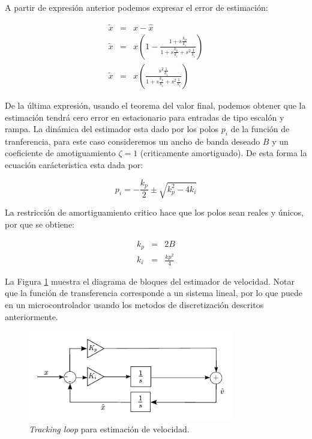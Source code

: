 A partir de expresión anterior podemos expresar el error de estimación:

\begin{eqnarray}
\tilde{x} &=& x - \hat{x} \\
\tilde{x} &=& x \left(1 -  \frac{1+s\frac{k_p}{k_i}}{1+s\frac{k_p}{k_i}+s^2\frac{1}{k_i}} \right) \\
\tilde{x} &=& x \left(\frac{s^2 \frac{1}{k_i}}{1+s\frac{k_p}{k_i}+s^2\frac{1}{k_i}}\right)
\end{eqnarray}

De la última expresión, usando el teorema del valor final, podemos obtener que la estimación tendrá cero error en estacionario para entradas de tipo escalón y rampa. La dinámica del estimador esta dado por los polos $p_i$ de la función de tranferencia, para este caso consideremos un ancho de banda deseado $B$ y un coeficiente de amotiguamiento $\zeta=1$ (criticamente amortiguado). De esta forma la ecuación carácteristica esta dada por:

\begin{equation}
p_i = -\frac{k_p}{2} \pm \sqrt{k_p^2-4k_i}
\end{equation}

La restricción de amortiguamiento critico hace que los polos sean reales y únicos, por que se obtiene:

\begin{eqnarray}
k_p &=& 2 B \\
k_i &=& \frac{kp^2}{4}
\end{eqnarray}

La Figura \ref{cap3_estimador_vel} muestra el diagrama de bloques del estimador de velocidad. Notar que la función de transferencia corresponde a un sistema lineal, por lo que puede en un microcontrolador usando los metodos de discretización descritos anteriormente.

\begin{figure}[H]
  \centering
  \includegraphics[width=0.8\textwidth]{img/cap3/estimador}
  \caption{\textit{Tracking loop} para estimación de velocidad.}
  \label{cap3_estimador_vel}
\end{figure}


